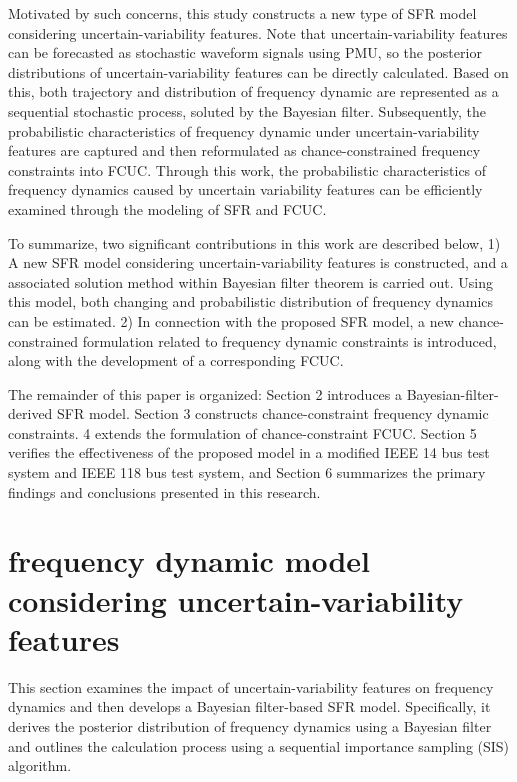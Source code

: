 \documentclass[lettersize,journal]{IEEEtran}
\begin{document}
Motivated by such concerns, this study constructs a new type of SFR model considering uncertain-variability features.  Note that uncertain-variability features can be forecasted as stochastic waveform
signals using PMU, so the posterior distributions of uncertain-variability features can be directly calculated. Based on this, both trajectory and distribution of frequency dynamic are represented as
a sequential stochastic process, soluted by the Bayesian filter.  Subsequently, the probabilistic characteristics of frequency dynamic under uncertain-variability features are captured and then
reformulated as chance-constrained frequency constraints into FCUC. Through this work, the probabilistic characteristics of frequency dynamics caused by uncertain variability features can be
efficiently examined through the modeling of SFR and FCUC.

To summarize, two significant contributions in this work are described below, 1) A new SFR model considering uncertain-variability features is constructed, and a associated solution method within
Bayesian filter theorem is carried out. Using this model, both changing and probabilistic distribution of frequency dynamics can be estimated.  2) In connection with the proposed SFR model, a new
chance-constrained formulation related to frequency dynamic constraints is introduced, along with the development of a corresponding FCUC.

The remainder of this paper is organized: Section {2} introduces a Bayesian-filter-derived SFR model. Section {3} constructs chance-constraint frequency dynamic constraints. {4} extends the
formulation of chance-constraint FCUC.  Section {5} verifies the effectiveness of the proposed model in a modified IEEE 14 bus test system and IEEE 118 bus test system, and Section {6} summarizes the
primary findings and conclusions presented in this research.

\vspace{-0.125in} \section{frequency dynamic model considering uncertain-variability features}

This section examines the impact of uncertain-variability features on frequency dynamics and then develops a Bayesian filter-based SFR model. Specifically, it derives the posterior distribution of
frequency dynamics using a Bayesian filter and outlines the calculation process using a sequential importance sampling (SIS) algorithm.
\end{document}
